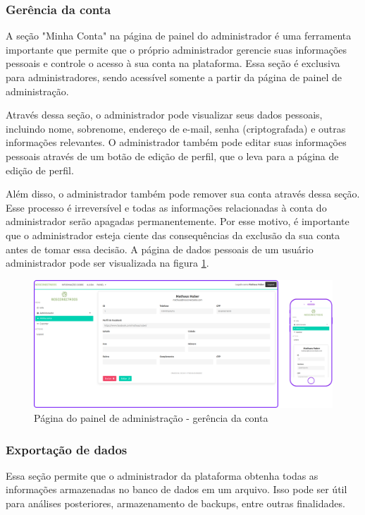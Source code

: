 \documentclass[tcc,capa]{texufpel}
\begin{document}
\subsubsection{Gerência da conta}
A seção "Minha Conta" na página de painel do administrador é uma ferramenta importante que permite que o próprio administrador gerencie suas informações pessoais e controle o acesso à sua conta na plataforma. Essa seção é exclusiva para administradores, sendo acessível somente a partir da página de painel de administração.

Através dessa seção, o administrador pode visualizar seus dados pessoais, incluindo nome, sobrenome, endereço de e-mail, senha (criptografada) e outras informações relevantes. O administrador também pode editar suas informações pessoais através de um botão de edição de perfil, que o leva para a página de edição de perfil.

Além disso, o administrador também pode remover sua conta através dessa seção. Esse processo é irreversível e todas as informações relacionadas à conta do administrador serão apagadas permanentemente. Por esse motivo, é importante que o administrador esteja ciente das consequências da exclusão da sua conta antes de tomar essa decisão. A página de dados pessoais de um usuário administrador pode ser visualizada na figura \ref{gerencia_conta}.
\begin{figure}[htbp]
  \centering \includegraphics[scale=.2]{assets/painelconta.png}
  \caption{Página do painel de administração - gerência da conta}
  \label{gerencia_conta}
\end{figure}
\newpage
\subsubsection{Exportação de dados}
Essa seção permite que o administrador da plataforma obtenha todas as informações armazenadas no banco de dados em um arquivo. Isso pode ser útil para análises posteriores, armazenamento de backups, entre outras finalidades.
\end{document}
